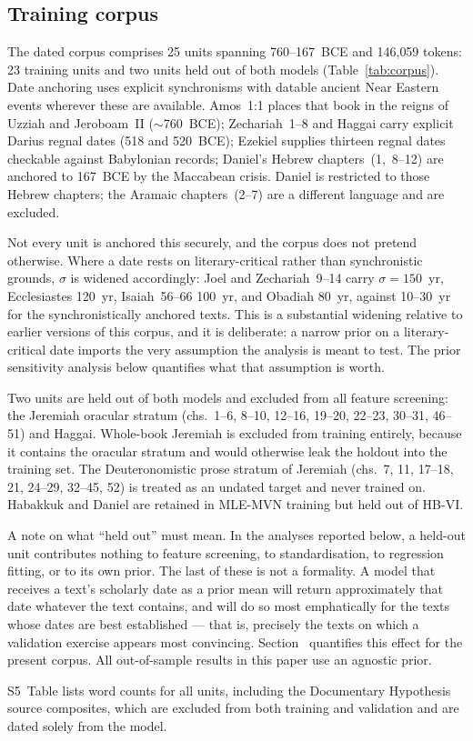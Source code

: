 \subsection*{Training corpus}

The dated corpus comprises 25 units spanning 760--167~BCE and 146{,}059
tokens: 23 training units and two units held out of both models
(Table~\ref{tab:corpus}).  Date anchoring uses explicit synchronisms with
datable ancient Near Eastern events wherever these are available.  Amos~1:1
places that book in the reigns of Uzziah and Jeroboam~II ($\sim$760~BCE);
Zechariah~1--8 and Haggai carry explicit Darius regnal dates (518 and
520~BCE); Ezekiel supplies thirteen regnal dates checkable against
Babylonian records; Daniel's Hebrew chapters~(1,~8--12) are anchored to
167~BCE by the Maccabean crisis.  Daniel is restricted to those Hebrew
chapters; the Aramaic chapters~(2--7) are a different language and are
excluded.

Not every unit is anchored this securely, and the corpus does not pretend
otherwise.  Where a date rests on literary-critical rather than
synchronistic grounds, $\sigma$ is widened accordingly: Joel and
Zechariah~9--14 carry $\sigma = 150$~yr, Ecclesiastes 120~yr, Isaiah~56--66
100~yr, and Obadiah 80~yr, against 10--30~yr for the synchronistically
anchored texts.  This is a substantial widening relative to earlier versions
of this corpus, and it is deliberate: a narrow prior on a literary-critical
date imports the very assumption the analysis is meant to test.  The prior
sensitivity analysis below quantifies what that assumption is worth.

Two units are held out of both models and excluded from all feature
screening: the Jeremiah oracular stratum (chs.~1--6, 8--10, 12--16, 19--20,
22--23, 30--31, 46--51) and Haggai.  Whole-book Jeremiah is excluded from
training entirely, because it contains the oracular stratum and would
otherwise leak the holdout into the training set.  The Deuteronomistic prose
stratum of Jeremiah (chs.~7, 11, 17--18, 21, 24--29, 32--45, 52) is treated
as an undated target and never trained on.  Habakkuk and Daniel are retained
in MLE-MVN training but held out of HB-VI.

A note on what ``held out'' must mean.  In the analyses reported below, a
held-out unit contributes nothing to feature screening, to standardisation,
to regression fitting, or to its own prior.  The last of these is not a
formality.  A model that receives a text's scholarly date as a prior mean
will return approximately that date whatever the text contains, and will do
so most emphatically for the texts whose dates are best established --- that
is, precisely the texts on which a validation exercise appears most
convincing.  Section~ quantifies this effect for the
present corpus.  All out-of-sample results in this paper use an agnostic
prior.

S5~Table lists word counts for all units, including the Documentary
Hypothesis source composites, which are excluded from both training and
validation and are dated solely from the model.
